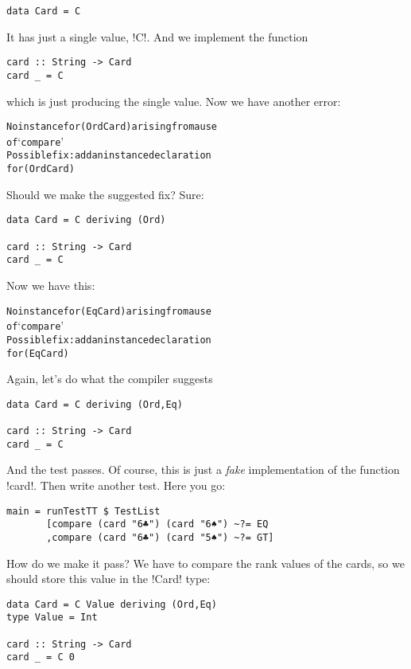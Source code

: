 \begin{lstlisting}[frame=single]
data Card = C 
\end{lstlisting}
It has just a single value, \il!C!. And we implement the function
\begin{lstlisting}[frame=single]
card :: String -> Card
card _ = C
\end{lstlisting}
which is just producing the single value.
\lhN \error Now we have another error:
\begin{small}
\begin{alltt}
No instance for (Ord Card) arising from a use 
of `compare' 
Possible fix: add an instance declaration 
for (Ord Card)
\end{alltt}
\end{small}
Should we make the suggested fix?
\lhA \error Sure:
\begin{lstlisting}[frame=single]
data Card = C deriving (Ord)

card :: String -> Card
card _ = C
\end{lstlisting}
\lhN \error Now we have this:
\begin{small}
\begin{alltt}
No instance for (Eq Card) arising from a use 
of `compare' 
Possible fix: add an instance declaration
for (Eq Card)
\end{alltt}
\end{small}
\hspace*{\fill} 
\lhA \error Again, let's do what the compiler suggests 
\begin{lstlisting}[frame=single]
data Card = C deriving (Ord,Eq)

card :: String -> Card
card _ = C
\end{lstlisting}
\success And the test passes.
\lhN Of course, this is just a \emph{fake} implementation of the function \il!card!.
\lhA Then write another test.
\lhN Here you go:
\begin{lstlisting}[frame=single]
main = runTestTT $ TestList 
       [compare (card "6♣") (card "6♠") ~?= EQ
       ,compare (card "6♣") (card "5♠") ~?= GT]
\end{lstlisting} %
How do we make it pass?
\lhA \error We have to compare the rank values of the cards, so we should store this value in the \il!Card! type:
\begin{lstlisting}[frame=single]
data Card = C Value deriving (Ord,Eq)
type Value = Int

card :: String -> Card
card _ = C 0
\end{lstlisting}
